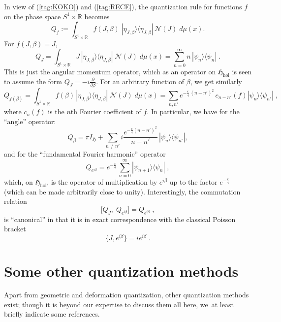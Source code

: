\documentclass[11pt]{amsart}
\numberwithin{equation}{section}
\theoremstyle{remark}
\newcommand\HH{\mathfrak H}
\begin{document}
In view of (\ref{tag:KOKO}) and (\ref{tag:RECE}), the quantization rule for
functions $f$ on the phase space $S^1\times \mathbb R$ becomes
\begin{equation}
Q_f := \int_{S^1\times \mathbb R} f(J, \beta )\; | \eta_{J, \beta}\rangle
\langle \eta_{J, \beta}| \, \mathcal{N}(J)\; d\mu(x) .  \label{tag: oper}
\end{equation}
For $f(J, \beta ) = J$,
\begin{equation}
  Q_J = \int_{S^1\times \mathbb R} J\, | \eta_{J,\beta} \rangle
   \langle \eta_{J,\beta} |\;\mathcal{N}(J)\;d\mu (x)
  = \sum_{n=0}^\infty n\, | \psi_n\rangle \langle \psi_n|\; .
\label{tag:Jsym}
\end{equation}
This is just the angular momentum operator, which as an operator on
$\HH_\text{hol}$ is seen to assume the form
$Q_J = -i\frac{\partial}{\partial \beta}$.
For an arbitrary function of $\beta$, we get similarly
\begin{equation}
 Q_{f(\beta)} = \int_{S^1\times \mathbb R}  f(\beta) \,  |\eta_{J,\beta}\rangle
  \langle \eta_{J,\beta} |\; \mathcal{N}(J)\; d\mu(x)  = \sum_{n,n'}
  e^{-\frac{\epsilon}{4}\,(n-n')^2} \,c_{n-n'}(f)| \psi_n\rangle
 \langle \psi_{n'} |\; ,
\label{tag:f(beta)}
\end{equation}
where $c_{n}(f)$ is the $n$th Fourier coefficient of $f$. In particular, we
have for the ``angle'' operator:
\begin{equation}
\label{tag:opangle}
 Q_{\beta} = \pi I_{\HH} +  \sum_{n\neq n'} i
 \frac{e^{-\frac{\epsilon}{4}(n-n')^2}}{n-n'}\, | \psi_n \rangle
 \langle \psi_{n'} |,
\end{equation}
and for the ``fundamental Fourier harmonic'' operator
\begin{equation}
\label{tag:opfourier}
Q_{e^{i\beta}} =  e^{-\frac{\epsilon}{4}}\, \sum_{n=0}^\infty
 | \psi_{n + 1}\rangle \langle \psi_n |\; ,
\end{equation}
which, on $\HH_\text{hol}$, is the operator of multiplication by  $e^{i\beta}$
up to the factor $e^{-\frac{\epsilon}{4}}$ (which can be made arbitrarily close
to unity). Interestingly, the commutation relation
\begin{equation}
 \lbrack Q_J, \;Q_{e^{i\beta}} \rbrack = Q_{e^{i\beta}}\;,
\label{tag:cylccr}
\end{equation}
is ``canonical'' in that it is in exact correspondence with the classical
Poisson bracket
$$\{ J, e^{i\beta}\} = i e^{i\beta}\; . $$



\section{Some other quantization methods} \label{sec6}
Apart from geometric and deformation quantization, other quantization methods
exist; though it is beyond our expertise to discuss them all here, we~at least
briefly indicate some references.
\end{document}
